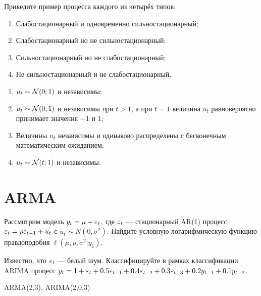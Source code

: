 \begin{problem}
Приведите пример процесса каждого из четырёх типов:
\begin{enumerate}
  \item Слабостационарный и одновременно сильностационарный;
  \item Слабостационарный но не сильностационарный;
  \item Сильностационарный но не слабостационарный;
  \item Не сильностационарный и не слабостационарный.
\end{enumerate}
\begin{sol}
\begin{enumerate}
  \item $u_t \sim \mathcal{N}(0;1)$ и независимы;
  \item $u_t \sim \mathcal{N}(0;1)$ и независимы при $t>1$, а при $t=1$ величина $u_t$ равновероятно
  принимает значения $-1$ и $1$;
  \item Величины $u_t$ независимы и одинаково распределены с бесконечным математическим ожиданием;
  \item $u_t \sim \mathcal{N}(t;1)$ и независимы.
\end{enumerate}
\end{sol}
\end{problem}







\chapter{ARMA}

\begin{problem}
Рассмотрим модель $y_t=\mu + \varepsilon_t$, где $\varepsilon_t$ — стационарный AR(1) процесс $\varepsilon_t=\rho \varepsilon_{t-1} + u_t$ с $u_t \sim N(0,\sigma^2)$. Найдите условную логарифмическую функцию правдоподобия $\ell(\mu, \rho, \sigma^2 | y_1)$.
\begin{sol}

\end{sol}
\end{problem}

\begin{problem}
Известно, что $\varepsilon_t$ — белый шум. Классифицируйте в рамках классификации ARIMA процесс $y_t=1+\varepsilon_t + 0.5\varepsilon_{t-1} + 0.4\varepsilon_{t-2} + 0.3\varepsilon_{t-3} + 0.2y_{t-1} + 0.1y_{t-2}$.
\begin{sol}

ARMA(2,3), ARIMA(2,0,3)
\end{sol}
\end{problem}


